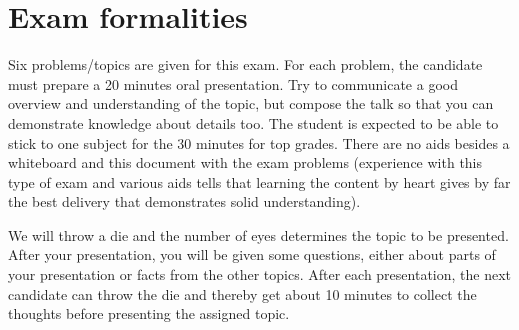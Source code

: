 \section*{Exam formalities}
Six problems/topics are given for this exam.
For each problem, the candidate must prepare a 20 minutes oral presentation.
Try to communicate a good overview and understanding of the topic, but compose the talk so that you can demonstrate knowledge about details too.
The student is expected to be able to stick to one subject for the 30 minutes for top grades.
There are no aids besides a whiteboard and this document with the exam problems (experience with this type of exam and various aids tells that learning the content by heart gives by far the best delivery that demonstrates solid understanding).

We will throw a die and the number of eyes determines the topic to be presented.
After your presentation, you will be given some questions, either about parts of your presentation or facts from the other topics.
After each presentation, the next candidate can throw the die and thereby get about 10 minutes to collect the thoughts before presenting the assigned topic.
